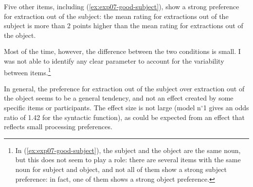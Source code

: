 Five other items, including (\ref{ex:exp07-good-subject}), show a strong preference for extraction out of the subject: the mean rating for extractions out of the subject is more than 2 points higher than the mean rating for extractions out of the object.

\eal\label{ex:exp07-good-subject}
\zl\largerpage

Most of the time, however, the difference between the two conditions is small. I was not able to identify any clear parameter to account for the variability between items.{\footnote{In (\ref{ex:exp07-good-subject}), the subject and the object are the same noun, but this does not seem to play a role: there are several items with the same noun for subject and object, and not all of them show a strong subject preference: in fact, one of them shows a strong object preference.}}

In general, the preference for extraction out of the subject over extraction out of the object seems to be a general tendency, and not an effect created by some specific items or participants. The effect size is not large (model n$^{\circ}$1 gives an odds ratio of 1.42 for the syntactic function), as could be expected from an effect that reflects small processing preferences.
